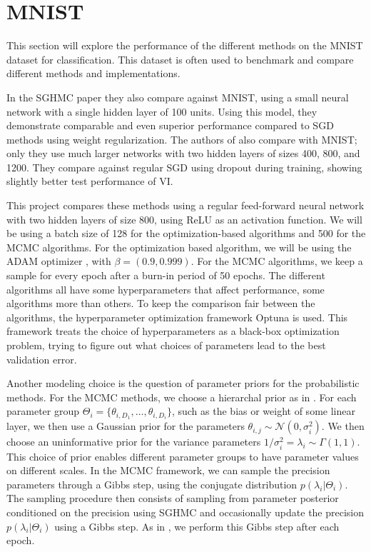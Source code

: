 \section{MNIST}
This section will explore the performance of the different methods on the MNIST dataset for classification. 
This dataset is often used to benchmark and compare different methods and implementations. 

In the SGHMC paper \autocite{chen_stochastic_2014} they also compare against MNIST, using a small neural network with a single hidden layer of 100 units.
Using this model, they demonstrate comparable and even superior performance compared to SGD methods using weight regularization.
The authors of \autocite{blundell_weight_2015} also compare with MNIST; only they use much larger networks with two hidden layers of sizes 400, 800, and 1200. 
They compare against regular SGD using dropout during training, showing slightly better test performance of VI.

This project compares these methods using a regular feed-forward neural network with two hidden layers of size 800, using ReLU as an activation function. 
We will be using a batch size of 128 for the optimization-based algorithms and 500 for the MCMC algorithms.
For the optimization based algorithm, we will be using the ADAM optimizer \autocite{kingma_adam_2017}, with $\beta=(0.9, 0.999)$.
For the MCMC algorithms, we keep a sample for every epoch after a burn-in period of 50 epochs.
The different algorithms all have some hyperparameters that affect performance, some algorithms more than others.
To keep the comparison fair between the algorithms, the hyperparameter optimization framework Optuna \autocite{akiba_optuna_2019} is used. 
This framework treats the choice of hyperparameters as a black-box optimization problem, trying to figure out what choices of parameters lead to the best validation error.

Another modeling choice is the question of parameter priors for the probabilistic methods. 
For the MCMC methods, we choose a hierarchal prior as in \autocite{chen_stochastic_2014}. 
For each parameter group $\Theta_i=\{\theta_{i,D_1},\dots,\theta_{i,D_i}\}$, such as the bias or weight of some linear layer, we then use a Gaussian prior for the parameters $\theta_{i,j} \sim  \mathcal{N}(0, \sigma_i^2)$.
We then choose an uninformative prior for the variance parameters $1/\sigma_i^2 = \lambda_i \sim \Gamma(1,1)$.
This choice of prior enables different parameter groups to have parameter values on different scales.
In the MCMC framework, we can sample the precision parameters through a Gibbs step, using the conjugate distribution $p(\lambda_i | \Theta_i)$.
The sampling procedure then consists of sampling from parameter posterior conditioned on the precision using SGHMC and occasionally update the precision $p(\lambda_i | \Theta_i)$ using a Gibbs step.
As in \autocite{chen_stochastic_2014}, we perform this Gibbs step after each epoch.

